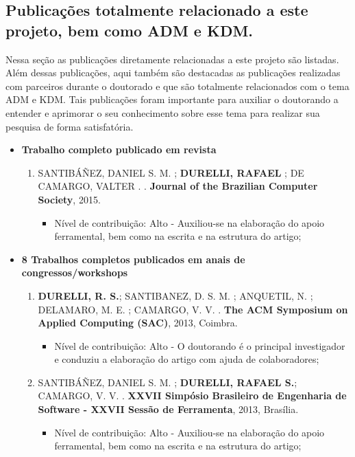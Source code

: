 \subsection{Publicações totalmente relacionado a este projeto, bem como ADM e KDM.}

Nessa seção as publicações diretamente relacionadas a este projeto são listadas. Além dessas publicações, aqui também são destacadas as publicações realizadas com parceiros durante o doutorado e que são totalmente relacionados com o tema ADM e KDM. Tais publicações foram importante para auxiliar o doutorando a entender e aprimorar o seu conhecimento sobre esse tema para realizar sua pesquisa de forma satisfatória.

\begin{itemize}
	\item \textbf{Trabalho completo publicado em revista}
			
			\begin{enumerate}
			    \item SANTIBÁÑEZ, DANIEL S. M. ; \textbf{DURELLI, RAFAEL} ; DE CAMARGO, VALTER . . \textbf{Journal of the Brazilian Computer Society}, 2015.
			  \begin{itemize}
			        \item Nível de contribuição: Alto - Auxiliou-se na elaboração do apoio ferramental, bem como na escrita e na estrutura do artigo;
			    \end{itemize}
			\end{enumerate}
	\item \textbf{8 Trabalhos completos publicados em anais de congressos/workshops}
	\begin{enumerate}
	 	
	 	\item \textbf{DURELLI, R. S.}; SANTIBANEZ, D. S. M. ; ANQUETIL, N. ; DELAMARO, M. E. ; CAMARGO, V. V. . \textbf{The ACM Symposium on Applied Computing (SAC)}, 2013, Coimbra.
	 	
	 	    \begin{itemize}
			        \item Nível de contribuição: Alto - O doutorando é o principal investigador e conduziu a elaboração do artigo com ajuda de colaboradores;
			    \end{itemize}
		
		\item SANTIBÁÑEZ, DANIEL S. M. ; \textbf{DURELLI, RAFAEL S.}; CAMARGO, V. V. . \textbf{XXVII Simpósio Brasileiro de Engenharia de Software - XXVII Sessão de Ferramenta}, 2013, Brasília.
		    \begin{itemize}
			        \item Nível de contribuição: Alto - Auxiliou-se na elaboração do apoio ferramental, bem como na escrita e na estrutura do artigo;
			    \end{itemize}
		

\end{enumerate}
\end{itemize}
